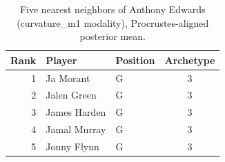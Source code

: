 \begin{table}[htbp]
  \centering\small
  \begin{tabular}{rllc}
    \toprule
    Rank & Player & Position & Archetype \\
    \midrule
    1 & Ja Morant & G & 3 \\
    2 & Jalen Green & G & 3 \\
    3 & James Harden & G & 3 \\
    4 & Jamal Murray & G & 3 \\
    5 & Jonny Flynn & G & 3 \\
    \bottomrule
  \end{tabular}
  \caption{Five nearest neighbors of Anthony Edwards (curvature_m1 modality), Procrustes-aligned posterior mean.}
  \label{tab:Anthony_Edwards_neighbors_curvature_m1}
\end{table}

